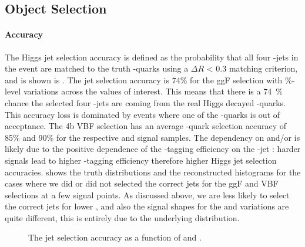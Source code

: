 \subsection{Object Selection}

  \paragraph{Accuracy} The Higgs jet selection accuracy is defined as the probability that all four \Pqb-jets in the event are matched to the truth \Pqb-quarks using a $\Delta R$ < 0.3 matching criterion, and is shown is \Fig{\ref{fig:jetSel-4b}}.
  The jet selection accuracy is 74\% for the ggF selection with \%-level variations across the \kl values of interest. 
  This means that there is a \SI{74}{\%} chance the selected four \Pqb-jets are coming from the real Higgs decayed \Pqb-quarks. This accuracy loss is dominated by events where one of the \Pqb-quarks is out of acceptance. 
  The 4b VBF selection has an average \Pqb-quark selection accuracy of 85\% and 90\% for the respective \kl and \kvv signal samples.
  The dependency on \kl and/or \kvv is likely due to the positive dependence of the \Pqb-tagging efficiency on the \Pqb-jet \pt: harder signals lead to higher \Pqb-tagging efficiency therefore higher Higgs jet selection accuracies. 
  \Fig{\ref{fig:jetSel-mhh}} shows the truth \mhh distributions and the reconstructed histograms for the cases where we did or did not selected the correct jets for the ggF and VBF selections at a few signal points. As discussed above, we are less likely to select the correct jets for lower \mhh, and also the signal shapes for the \kl and \kvv variations are quite different, this is entirely due to the underlying \mhh distribution.
    
  \begin{figure}[hbt]
	  \centering
	  \caption{The jet selection accuracy as a function of \kl and \kvv.}
	  \label{fig:jetSel-4b}
  \end{figure}

